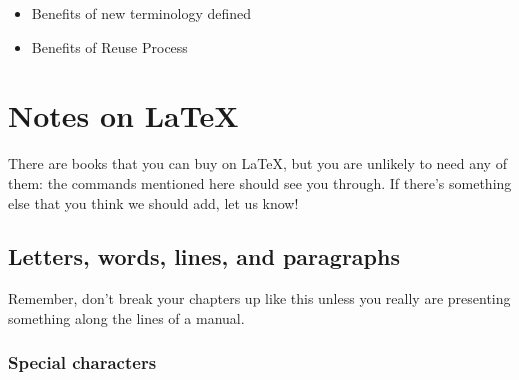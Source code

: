 \documentclass[dissertation]{softeng}
\begin{document}
\begin{itemize}

\item Benefits of new terminology defined \cite{Glinz:2007ehba}  
\item Benefits of Reuse Process\cite{Leite:2005wpba}

\end{itemize}




\appendix

\chapter{Notes on \LaTeX}
\label{chap:latex}

There are books that you can buy on \LaTeX, but you are unlikely to
need any of them: the commands mentioned here should see you through.
If there's something else that you think we should add, let us know!

\section{Letters, words, lines, and paragraphs}

Remember, don't break your chapters up like this unless you really are
presenting something along the lines of a manual.   

\subsection{Special characters}
\end{document}
